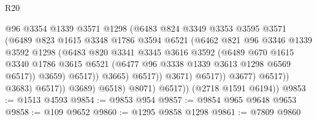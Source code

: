 \begin{lexlean}{R20}
\begin{coremodule}
                                      @96
                                      @3354
                                      @1339
                                      @3571
                                      @1298
                                      (@6483
                                        @824
                                        @3349
                                        @3353
                                        @3595
                                        @3571
                                        (@6489
                                          @823
                                          @1615
                                          @3348
                                          @1786
                                          @3594
                                          @6521
                                          (@6462
                                            @821
                                            @96
                                            @3346
                                            @1339
                                            @3592
                                            @1298
                                            (@6483
                                              @820
                                              @3341
                                              @3345
                                              @3616
                                              @3592
                                              (@6489
                                                @670
                                                @1615
                                                @3340
                                                @1786
                                                @3615
                                                @6521
                                                (@6477 @96 @3338 @1339 @3613 @1298 @6569 @6517))
                                              @3659)
                                            @6517))
                                        @3665)
                                      @6517))
                                  @3671)
                                @6517))
                            @3677)
                          @6517))
                      @3683)
                    @6517))
                @3689)
              @6518)
            @8071)
          @6517))
      (@2718 @1591 @6194))
@9853 := @1513 @4593
@9854 := @9853 @954
@9857 := @9854 @965 @9648 @9653
@9858 := @109 @9652
@9860 := @1295 @9858 @1298
@9861 := @7809 @9860

\end{coremodule}
\end{lexlean}
